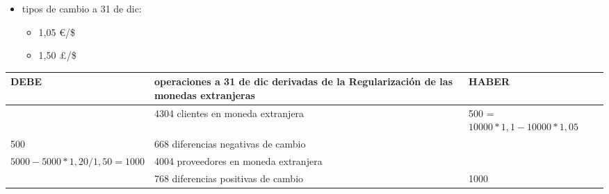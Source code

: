 \documentclass[a4paper,12pt]{article}
\begin{document}
\begin{itemize}
    \item tipos de cambio a 31 de dic:
    \begin{itemize}
        \item 1,05 \euro/\$
        \item 1,50 \pounds/\$
    \end{itemize}
\end{itemize}
\begin{table}[H]
    \centering
    \begin{tabular}{|p{3cm}|p{6cm}|p{3cm}|}
    \hline
    \textbf{DEBE} & \textbf{operaciones a 31 de dic derivadas de la Regularización de las monedas extranjeras} & \textbf{HABER} \\
    \hline
    & 4304 clientes en moneda extranjera& 500 = $10000*1,1 - 10000*1,05$\\
    \hline
    500 & 668 diferencias negativas de cambio& \\
    \hline
    $5000-5000*1,20/1,50= 1000 $& 4004 proveedores en moneda extranjera & \\
    \hline
    & 768 diferencias positivas de cambio& 1000 \\
    \hline
    \end{tabular}
\end{table}
\end{document}
